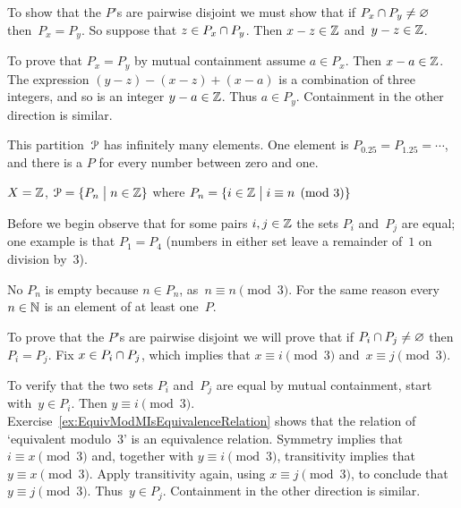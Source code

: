 \documentclass{ibl}  %
\begin{document}
\begin{problem}
\begin{exes}
\begin{answer}
  To show that the $P$'s are pairwise disjoint 
  we must show that
  if $P_x\cap P_y\neq\varnothing$ then~$P_x=P_y$.
  So suppose that $z\in P_x\cap P_y$.
  Then $x-z\in\mathbb{Z}$ and~$y-z\in \mathbb{Z}$.
  
  To prove that $P_x=P_y$ by mutual containment assume $a\in P_x$.
  Then $x-a\in\mathbb{Z}$.
  The expression $(y-z)-(x-z)+(x-a)$ is a combination of three integers,
  and so is an integer $y-a\in\mathbb{Z}$.
  Thus $a\in P_y$.
  Containment in the other direction is similar.

  This partition~$\EuScript{P}$ has infinitely many elements.
  One element is $P_{0.25}=P_{1.25}=\cdots$, and there is a $P$ for every
  number between zero and one.  
\end{answer}
\begin{exercise} 
     $X=\mathbb{Z}$, $\EuScript{P}=\{P_n \bigm| n\in\mathbb{Z}\}$
      where $P_n=\{i\in\mathbb{Z} \bigm| i\equiv n\pmod 3\}$
\end{exercise}
\begin{answer}
  Before we begin observe that 
  for some pairs $i,j\in\mathbb{Z}$ the sets $P_i$ and~$P_j$ are equal;
  one example is that $P_1=P_4$ (numbers in either set leave a remainder 
  of~$1$ on division by~$3$).

  No $P_n$ is empty because $n\in P_n$, as~$n\equiv n\pmod 3$.
  For the same reason every~$n\in\mathbb{N}$ is an element of at least
  one~$P$.

  To prove that the $P$'s are pairwise disjoint
  we will prove that if 
  $P_i\cap P_j\neq \varnothing$ then $P_i=P_j$.
  Fix $x\in P_i\cap P_j$, which implies that
  $x\equiv i\pmod 3$ and~$x\equiv j\pmod 3$.

  To verify that the two sets $P_i$ and~$P_j$ are equal by mutual
  containment, start with~$y\in P_i$.
  Then $y\equiv i\pmod 3$.
  Exercise~\ref{ex:EquivModMIsEquivalenceRelation}
  shows that the relation of `equivalent modulo~$3$' is an 
  equivalence relation.
  Symmetry implies that $i\equiv x\pmod 3$ and, 
  together with $y\equiv i\pmod 3$,
  transitivity implies that $y\equiv x\pmod 3$.
  Apply transitivity again, using $x\equiv j\pmod 3$, to conclude that
  $y\equiv j\pmod 3$. 
  Thus~$y\in P_j$.
  Containment in the other direction is similar.  


\end{answer}
\end{exes}
\end{problem}
\end{document}

